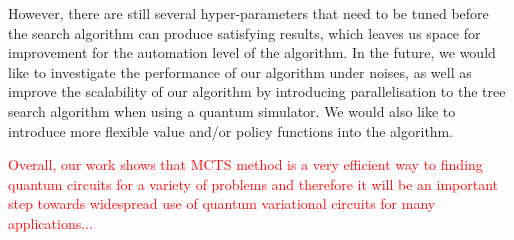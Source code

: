 \documentclass[a4paper,onecolumn,11pt]{quantumarticle}
\begin{document}
However, there are still several hyper-parameters that need to be tuned before the search algorithm can produce satisfying results, which leaves us space for improvement for the automation level of the algorithm. In the future, we would like to investigate the performance of our algorithm under noises, as well as improve the scalability of our algorithm by introducing parallelisation to the tree search algorithm when using a quantum simulator. We would also like to introduce more flexible value and/or policy functions into the algorithm.

\textcolor{red}{Overall, our work shows that MCTS method is a very efficient way to finding quantum circuits for a variety of problems and therefore it will be an important step towards widespread use of quantum variational circuits for many applications... }





\typeout{} 

\end{document}
